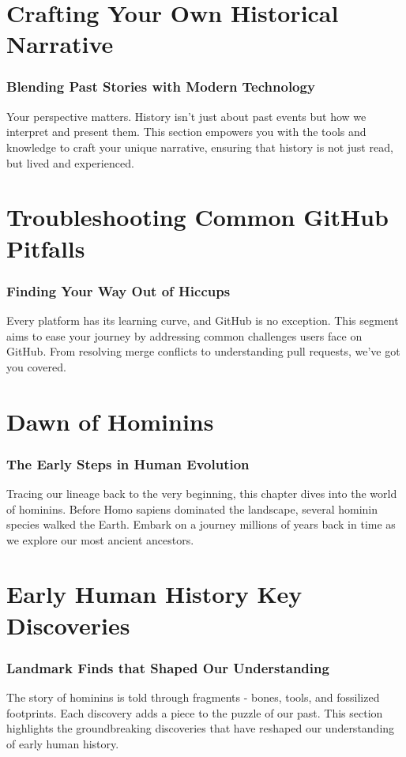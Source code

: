 \documentclass[a4paper,12pt]{book}
\begin{document}
\chapter{Crafting Your Own Historical Narrative}
\subsection*{Blending Past Stories with Modern Technology}
Your perspective matters. History isn't just about past events but how we interpret and present them. This section empowers you with the tools and knowledge to craft your unique narrative, ensuring that history is not just read, but lived and experienced.

\chapter{Troubleshooting Common GitHub Pitfalls}
\subsection*{Finding Your Way Out of Hiccups}
Every platform has its learning curve, and GitHub is no exception. This segment aims to ease your journey by addressing common challenges users face on GitHub. From resolving merge conflicts to understanding pull requests, we've got you covered.

\chapter{Dawn of Hominins}
\subsection*{The Early Steps in Human Evolution}
Tracing our lineage back to the very beginning, this chapter dives into the world of hominins. Before Homo sapiens dominated the landscape, several hominin species walked the Earth. Embark on a journey millions of years back in time as we explore our most ancient ancestors.

\chapter{Early Human History Key Discoveries}
\subsection*{Landmark Finds that Shaped Our Understanding}
The story of hominins is told through fragments - bones, tools, and fossilized footprints. Each discovery adds a piece to the puzzle of our past. This section highlights the groundbreaking discoveries that have reshaped our understanding of early human history.
\end{document}
